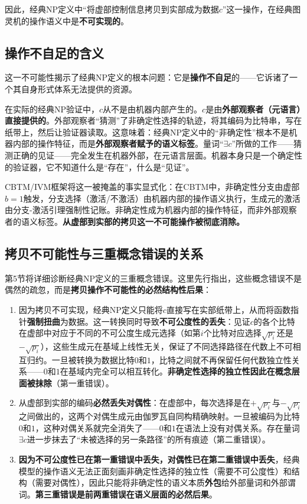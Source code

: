 \documentclass{ctexart}
\begin{document}
	因此，经典NP定义中``将虚部控制信息拷贝到实部成为数据$c$''这一操作，在经典图灵机的操作语义中是\textbf{不可实现的}。
	
	\subsection{操作不自足的含义}
	
	这一不可能性揭示了经典NP定义的根本问题：它是\textbf{操作不自足}的——它诉诸了一个其自身形式体系无法提供的资源。
	
	在实际的经典NP验证中，$c$从不是由机器内部产生的。$c$是由\textbf{外部观察者（元语言）直接提供的}。外部观察者``猜测''了非确定性选择的轨迹，将其编码为比特串，写在纸带上，然后让验证器读取。这意味着：经典NP定义中的``非确定性''根本不是机器内部的操作特征，而是\textbf{外部观察者赋予的语义标签}。量词``$\exists c$''所做的工作——猜测正确的见证——完全发生在机器外部，在元语言层面。机器本身只是一个确定性的验证器，它不知道什么是``存在''，什么是``见证''。
	
	CBTM/IVM框架将这一被掩盖的事实显式化：在CBTM中，非确定性分支由虚部$b=1$触发，分支选择（激活/不激活）由机器内部的操作语义执行，生成元的激活由分支-激活引理强制性记账。非确定性成为机器内部的操作特征，而非外部观察者的语义标签。\textbf{从虚部到实部的拷贝这一不可能操作被彻底消除。}
	
	\subsection{拷贝不可能性与三重概念错误的关系}
	
	第5节将详细诊断经典NP定义的三重概念错误。这里先行指出，这些概念错误不是偶然的疏忽，而是\textbf{拷贝操作不可能性的必然结构性后果}：
	
	\begin{enumerate}
		\item 因为拷贝不可实现，经典NP定义只能将$c$直接写在实部纸带上，从而将函数指针\textbf{强制扭曲}为数据。这一转换同时导致\textbf{不可公度性的丢失}：见证$c$的各个比特在虚部中对应于不同的不可公度生成元选择（如第$i$个比特对应选择$\sqrt{p_i}$还是$-\sqrt{p_i}$），这些生成元在基域上线性无关，保证了不同选择路径在代数上不可相互归约。一旦被转换为数据比特$0$和$1$，比特之间就不再保留任何代数独立性关系——$0$和$1$在基域内完全可以相互转化。\textbf{非确定性选择的独立性因此在概念层面被抹除}（第一重错误）。
		
		\item 从虚部到实部的编码\textbf{必然丢失对偶性}：在虚部中，每次选择是在$+\sqrt{p_i}$与$-\sqrt{p_i}$之间做出的，这两个对偶生成元由伽罗瓦自同构精确映射。一旦被编码为比特$0$和$1$，这种对偶关系就完全消失了——$0$和$1$在语法上没有对偶关系。存在量词$\exists c$进一步抹去了``未被选择的另一条路径''的所有痕迹（第二重错误）。
		
		\item \textbf{因为不可公度性已在第一重错误中丢失，对偶性已在第二重错误中丢失}，经典模型的操作语义无法正面刻画非确定性选择的独立性（需要不可公度性）和结构（需要对偶性），因此只能将非确定性的语义本质\textbf{外包}给外部量词和外部谓词。\textbf{第三重错误是前两重错误在语义层面的必然后果}。
	\end{enumerate}
	
\end{document}
